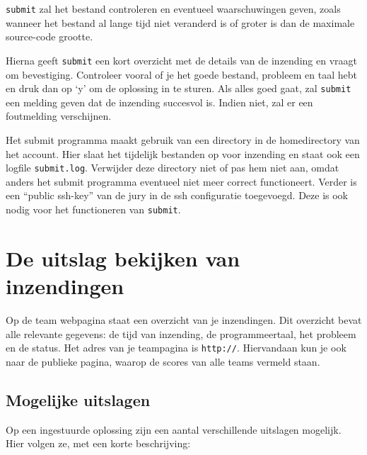 \documentclass[11pt,a4paper]{article}
\newcommand{\url}[1]{\texttt{#1}}
\begin{document}
\texttt{submit} zal het bestand controleren en eventueel
waarschuwingen geven, zoals wanneer het bestand al lange tijd niet
veranderd is of groter is dan de maximale source-code grootte.

Hierna geeft \texttt{submit} een kort overzicht met de details van de
inzending en vraagt om bevestiging. Controleer vooral of je het goede
bestand, probleem en taal hebt en druk dan op `y' om de oplossing in
te sturen. Als alles goed gaat, zal \texttt{submit} een melding geven
dat de inzending succesvol is. Indien niet, zal er een foutmelding
verschijnen.

Het submit programma maakt gebruik van een directory \texttt{\USERSUBMITDIR}
in de homedirectory van het account. Hier slaat het tijdelijk
bestanden op voor inzending en staat ook een logfile \texttt{submit.log}.
Verwijder deze directory niet of pas hem niet aan, omdat anders het
submit programma eventueel niet meer correct functioneert. Verder
is een ``public ssh-key'' van de jury in de ssh configuratie
toegevoegd. Deze is ook nodig voor het functioneren van \texttt{submit}.
 
\section{De uitslag bekijken van inzendingen}

Op de team webpagina staat een overzicht van je inzendingen.
Dit overzicht bevat alle relevante gegevens: de tijd van inzending, de
programmeertaal, het probleem en de status. Het adres van je
teampagina is \url{http://\WEBSERVER}. Hiervandaan kun je ook naar
de publieke pagina, waarop de scores van alle teams vermeld staan.

\subsection{Mogelijke uitslagen}

Op een ingestuurde oplossing zijn een aantal verschillende uitslagen
mogelijk. Hier volgen ze, met een korte beschrijving:
\end{document}
